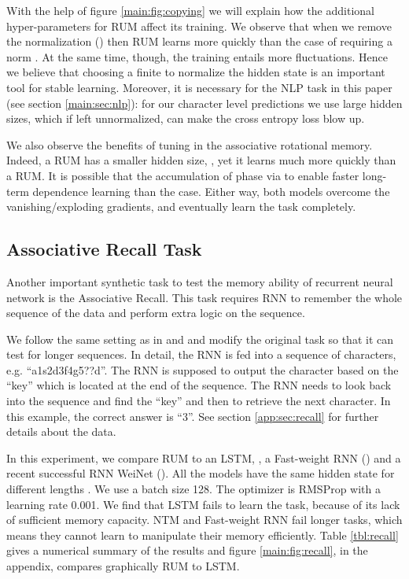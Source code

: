 \documentclass{article} \usepackage{iclr2018_conference,times}
\begin{document}
With the help of figure \ref{main:fig:copying} we will explain how the additional hyper-parameters for RUM affect its training. We observe that when we remove the normalization () then RUM learns more quickly than the case of requiring a norm . At the same time, though, the training entails more fluctuations. Hence we believe that choosing a finite  to normalize the hidden state is an important tool for stable learning. Moreover, it is necessary for the NLP task in this paper (see section \ref{main:sec:nlp}): for our character level predictions we use large hidden sizes, which if left unnormalized, can make the cross entropy loss blow up.

We also observe the benefits of tuning in the associative rotational memory. Indeed, a  RUM has a smaller hidden size, , yet it learns much more quickly than a  RUM. It is possible that the accumulation of phase via  to enable faster long-term dependence learning than the  case. Either way, both models overcome the vanishing/exploding gradients, and eventually learn the task completely. 


\subsection{Associative Recall Task}
Another important synthetic task to test the memory ability of recurrent neural network is the Associative Recall. This task requires RNN to remember the whole sequence of the data and perform extra logic on the sequence.

We follow the same setting as in \cite{ba2016using} and \cite{zhang2017learning} and modify the original task so that it can test for longer sequences. In detail, the RNN is fed into a sequence of characters, e.g. ``a1s2d3f4g5??d''. The RNN is supposed to output the character based on the ``key'' which is located at the end of the sequence. The RNN needs to look back into the sequence and find the ``key'' and then to retrieve the next character. In this example, the correct answer is ``3''. See section \ref{app:sec:recall} for further details about the data. 

In this experiment, we compare RUM to an LSTM, , a Fast-weight RNN (\cite{ba2016using}) and a recent successful RNN WeiNet (\cite{zhang2017learning}). All the models have the same hidden state  for different lengths . We use a batch size 128. The optimizer is RMSProp with a learning rate 0.001. We find that LSTM fails to learn the task, because of its lack of sufficient memory capacity. NTM and Fast-weight RNN fail longer tasks, which means they cannot learn to manipulate their memory efficiently. Table \ref{tbl:recall} gives a numerical summary of the results and figure \ref{main:fig:recall}, in the appendix, compares graphically RUM to LSTM.
\end{document}
